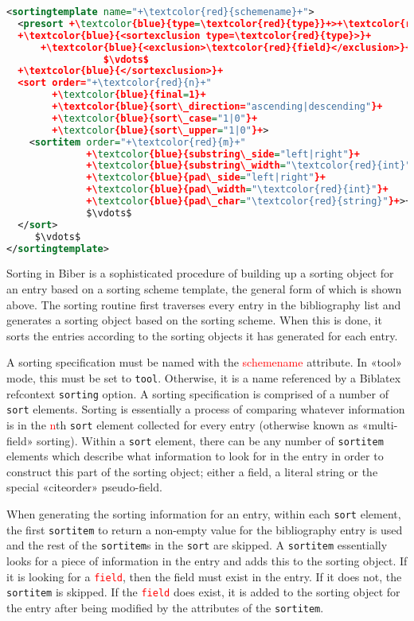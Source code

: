\documentclass{ltxdockit}
\newcommand*{\biber}{Biber\xspace}
\newcommand*{\biblatex}{Biblatex\xspace}
\begin{document}
\begin{lstlisting}[language=xml,escapechar=+,mathescape=true]
<sortingtemplate name="+\textcolor{red}{schemename}+">
  <presort +\textcolor{blue}{type=\textcolor{red}{type}}+>+\textcolor{red}{string}+</presort>
  +\textcolor{blue}{<sortexclusion type=\textcolor{red}{type}>}+
      +\textcolor{blue}{<exclusion>\textcolor{red}{field}</exclusion>}+
                 $\vdots$
  +\textcolor{blue}{</sortexclusion>}+
  <sort order="+\textcolor{red}{n}+"
        +\textcolor{blue}{final=1}+
        +\textcolor{blue}{sort\_direction="ascending|descending"}+
        +\textcolor{blue}{sort\_case="1|0"}+
        +\textcolor{blue}{sort\_upper="1|0"}+>
    <sortitem order="+\textcolor{red}{m}+"
              +\textcolor{blue}{substring\_side="left|right"}+
              +\textcolor{blue}{substring\_width="\textcolor{red}{int}"}+
              +\textcolor{blue}{pad\_side="left|right"}+
              +\textcolor{blue}{pad\_width="\textcolor{red}{int}"}+
              +\textcolor{blue}{pad\_char="\textcolor{red}{string}"}+>+\textcolor{red}{field|literal|citeorder}+</sortitem>
              $\vdots$
  </sort>
     $\vdots$
</sortingtemplate>
\end{lstlisting}

Sorting in \biber is a sophisticated procedure of building up a sorting
object for an entry based on a sorting scheme template, the general form of
which is shown above. The sorting routine first traverses every entry in
the bibliography list and generates a sorting object based on the sorting
scheme. When this is done, it sorts the entries according to the sorting
objects it has generated for each entry.

A sorting specification must be named with the \textcolor{red}{schemename}
attribute. In «tool» mode, this must be set to \texttt{tool}. Otherwise, it
is a name referenced by a \biblatex refcontext \texttt{sorting} option.
A sorting specification is comprised of a number of \texttt{sort} elements.
Sorting is essentially a process of comparing whatever information is in
the \textcolor{red}{n}th \texttt{sort} element collected for every entry
(otherwise known as «multi-field» sorting). Within a \texttt{sort} element,
there can be any number of \texttt{sortitem} elements which describe what
information to look for in the entry in order to construct this part of the
sorting object; either a field, a literal string or the special «citeorder»
pseudo-field.

When generating the sorting information for an entry, within each
\texttt{sort} element, the first \texttt{sortitem} to return a non-empty
value for the bibliography entry is used and the rest of the
\texttt{sortitem}s in the \texttt{sort} are skipped. A \texttt{sortitem}
essentially looks for a piece of information in the entry and adds this to
the sorting object. If it is looking for a \textcolor{red}{\texttt{field}},
then the field must exist in the entry. If it does not, the
\texttt{sortitem} is skipped. If the \textcolor{red}{\texttt{field}} does
exist, it is added to the sorting object for the entry after being modified
by the attributes of the \texttt{sortitem}.
\end{document}
